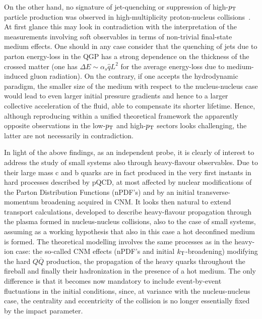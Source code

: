 On the other hand, no signature of jet-quenching or suppression of high-$p\sb{\scriptstyle\mathrm{T}}$ particle production was observed in high-multiplicity proton-nucleus collisions~\cite{Acharya:2018qsh}.  At first glance this may look in contradiction with the interpretation of the  measurements involving soft observables in terms of non-trivial final-state medium effects. One should in any case consider that the quenching of jets due to parton energy-loss in the QGP has a strong dependence on the thickness of the crossed matter (one has $\Delta E\sim \alpha_s\hat q L^2$ for the average energy-loss due to medium-induced gluon radiation). On the contrary, if one accepts the hydrodynamic paradigm, the smaller size of the medium with respect to the nucleus-nucleus case would lead to even larger initial pressure gradients and hence to a larger collective acceleration of the fluid, able to compensate its shorter lifetime. Hence, although reproducing within a unified theoretical framework the apparently opposite observations in the low-$p\sb{\scriptstyle\mathrm{T}}$ and high-$p\sb{\scriptstyle\mathrm{T}}$ sectors looks challenging, the latter are not necessarily in contradiction.

In light of the above findings, as an independent probe, it is clearly of interest to address the study of small systems also through heavy-flavour observables. Due to their large mass c and b quarks are in fact produced in the very first instants in hard processes described by pQCD, at most affected by nuclear modifications of the Parton Distribution Functions (nPDF's) and by an initial transverse-momentum broadening acquired in CNM. %
It looks then natural to extend transport calculations, developed to describe heavy-flavour propagation through the plasma formed in nucleus-nucleus collisions, also to the case of small systems, assuming as a working hypothesis that also in this case a hot deconfined medium is formed. The theoretical modelling involves the same processes as in the heavy-ion case: the so-called CNM effects (nPDF's and initial $k_{\rm T}$-broadening) modifying the hard $Q\overline{Q}$ production, the propagation of the heavy quarks throughout the fireball and finally their hadronization in the presence of a hot medium. The only difference is that it becomes now mandatory to include event-by-event fluctuations in the initial conditions, since, at variance with the nucleus-nucleus case, the centrality and eccentricity of the collision is no longer essentially fixed by the impact parameter. 

